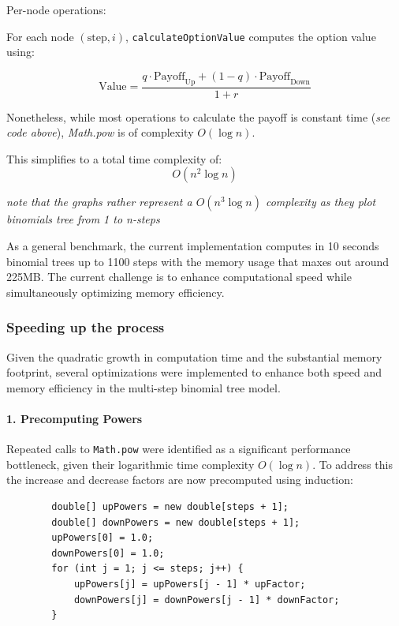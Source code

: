 \documentclass{article}
\begin{document}
    \medbreak
    Per-node operations:

    For each node \( ( \text{step}, i ) \), \texttt{calculateOptionValue} computes the option value using:

    \[
        \text{Value} = \frac{q \cdot \text{Payoff}_{\text{Up}} + (1 - q) \cdot \text{Payoff}_{\text{Down}}}{1 + r}
    \]

    Nonetheless, while most operations to calculate the payoff is constant time (\emph{see code above}), \emph{Math.pow} is of complexity \( O(\log n) \).

    \bigskip

    This simplifies to a total time complexity of:
    \[
    O(n^2 \log n)
    \]

    \bigbreak

    \emph{note that the graphs rather represent a \( O(n^3 \log n) \) complexity as they plot binomials tree from 1 to n-steps}

    \bigbreak

    As a general benchmark, the current implementation computes in 10 seconds binomial trees up to 1100 steps with the memory usage that maxes out around 225MB.
    The current challenge is to enhance computational speed while simultaneously optimizing memory efficiency.

    \subsubsection{Speeding up the process}

    Given the quadratic growth in computation time and the substantial memory footprint, several optimizations were implemented to enhance both speed and memory efficiency in the multi-step binomial tree model.

    \paragraph{1. Precomputing Powers}
    Repeated calls to \texttt{Math.pow} were identified as a significant performance bottleneck, given their logarithmic time complexity \(O(\log n)\).
    To address this the increase and decrease factors are now precomputed using induction:

    \begin{verbatim}
        double[] upPowers = new double[steps + 1];
        double[] downPowers = new double[steps + 1];
        upPowers[0] = 1.0;
        downPowers[0] = 1.0;
        for (int j = 1; j <= steps; j++) {
            upPowers[j] = upPowers[j - 1] * upFactor;
            downPowers[j] = downPowers[j - 1] * downFactor;
        }
    \end{verbatim}
\end{document}

